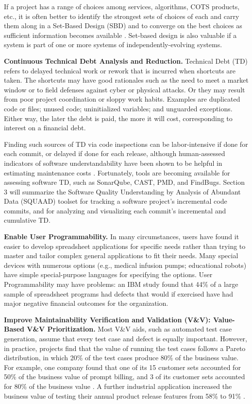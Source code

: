 If a project has a range of choices among services, algorithms, COTS products, etc., it is often better to identify the strongest sets of choices of each and carry them along in a Set-Based Design (SBD) and to converge on the best choices as sufficient information becomes available 
\citep{bernstein1998design,reinertsten2009principles}.  Set-based design is also valuable if a system is part of one or more systems of independently-evolving systems.

\textbf{Continuous Technical Debt Analysis and Reduction.}  Technical Debt (TD) refers to delayed technical work or rework that is incurred when shortcuts are taken.  The shortcuts may have good rationales such as the need to meet a market window or to field defenses against cyber or physical attacks.  Or they may result from poor project coordination or sloppy work habits.  Examples are duplicated code or files; unused code; uninitialized variables; and unguarded exceptions.  Either way, the later the debt is paid, the more it will cost, corresponding to interest on a financial debt.

Finding such sources of TD via code inspections can be labor-intensive if done for each commit, or delayed if done for each release, although human-assessed indicators of software understandability have been shown to be helpful in estimating maintenance costs \citep{chen2016evaluating}.  Fortunately, tools are becoming available for assessing software TD, such as SonarQube, CAST, PMD, and FindBugs.  Section 3 will summarize the Software Quality Understanding by Analysis of Abundant Data (SQUAAD) toolset for tracking a software project's incremental code commits, and for analyzing and visualizing each commit's incremental and cumulative TD.

\textbf{Enable User Programmability.} In many circumstances, users have found it easier to develop spreadsheet applications for specific needs rather than trying to master and tailor complex general applications to fit their needs.   Many special devices with numerous options (e.g., medical infusion pumps; educational robots) have simple special-purpose languages for specifying the options.  User Programmability may have problems: an IBM study found that 44\% of a large sample of spreadsheet programs had defects that would if exercised have had major negative financial outcomes for the organization.

\textbf{Improve Maintainability Verification and Validation (V\&V): Value-Based V\&V Prioritization.}  Most V\&V aids, such as automated test case generation, assume that every test case and defect is equally important.  However, in practice, projects find that the value of running the test cases follows a Pareto distribution, in which 20\% of the test cases produce 80\% of the business value.  For example, one company found that one of its 15 customer sets accounted for 50\% of the business value of prompt billing, and 3 of its customer sets accounted for 80\% of the business value \citep{bullock2000calculating}.   A further industrial application increased the business value of testing their annual product release features from 58\% to 91\% \citep{li2012value}.

